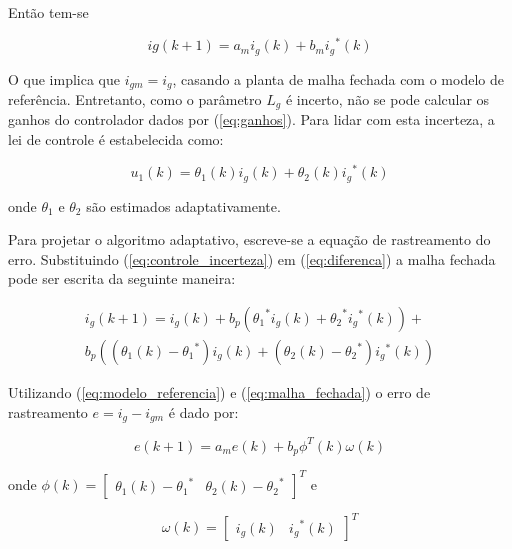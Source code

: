     Então tem-se

    \begin{equation}
        ig (k + 1) = a_m i_g (k) + b_m {i_g}^* (k)
    \end{equation}

    O que implica que $i_{gm} = i_g$, casando a planta de malha fechada com o
    modelo de referência. Entretanto, como o parâmetro $L_g$ é incerto, não se pode
    calcular os ganhos do controlador dados por (\ref{eq:ganhos}). Para lidar
    com esta incerteza, a lei de controle é estabelecida como:

    \begin{equation}
        u_1 (k) = \theta_1 (k) i_g (k) + \theta_2 (k) {i_g}^* (k)
        \label{eq:controle_incerteza}
    \end{equation}

    onde $\theta_1$ e $\theta_2$ são estimados adaptativamente.

    Para projetar o algoritmo adaptativo, escreve-se a equação de rastreamento do erro.
    Substituindo (\ref{eq:controle_incerteza}) em (\ref{eq:diferenca}) a malha fechada
    pode ser escrita da seguinte maneira:

    \begin{multline}
        i_g (k + 1) = i_g (k) + b_p \left( {\theta_1}^* i_g (k) + {\theta_2}^* {i_g}^*
            (k) \right) + \\
            b_p \left( (\theta_1 (k) - {\theta_1}^*) i_g (k) + ( \theta_2 (k)
            - {\theta_2}^*) {i_g}^* (k) \right)
        \label{eq:malha_fechada}
    \end{multline}

    Utilizando (\ref{eq:modelo_referencia}) e (\ref{eq:malha_fechada}) o erro de
    rastreamento $e = i_g - i_{gm}$ é dado por:

    \begin{equation}
        e (k+1) = a_m e(k) + b_p \phi^T (k) \omega (k)
        \label{eq:erro_rastreamento}
    \end{equation}

    onde $\phi (k) = {\left[ \begin{matrix} \theta_1 (k) - {\theta_1}^* & \theta_2 (k) - {\theta_2}^*
    \end{matrix} \right]}^T$ e

    \begin{equation}
        \omega (k) = {\left[ \begin{matrix} i_g (k) & {i_g}^* (k) \end{matrix} \right]}^T
        \label{eq:omega_k}
    \end{equation}

